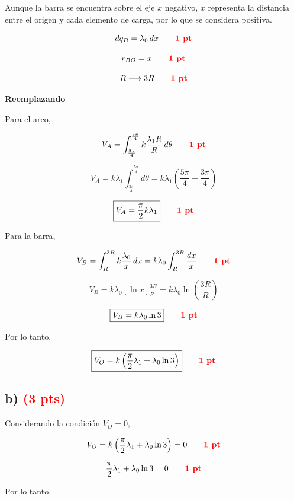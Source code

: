 \documentclass[12pt]{article}
\begin{document}
Aunque la barra se encuentra sobre el eje $x$ negativo, $x$ representa
la distancia entre el origen y cada elemento de carga, por lo que se
considera positiva.

\[
dq_B=\lambda_0\,dx
\qquad
\textcolor{red}{\textbf{1 pt}}
\]

\[
r_{BO}=x
\qquad
\textcolor{red}{\textbf{1 pt}}
\]

\[
R\longrightarrow3R
\qquad
\textcolor{red}{\textbf{1 pt}}
\]

\vspace{0.4cm}

\textbf{Reemplazando}

Para el arco,

\[
V_A
=
\int_{\frac{3\pi}{4}}^{\frac{5\pi}{4}}
k\frac{\lambda_1R}{R}\,d\theta
\qquad
\textcolor{red}{\textbf{1 pt}}
\]

\[
V_A
=
k\lambda_1
\int_{\frac{3\pi}{4}}^{\frac{5\pi}{4}}d\theta
=
k\lambda_1
\left(
\frac{5\pi}{4}-\frac{3\pi}{4}
\right)
\]

\[
\boxed{
V_A=\frac{\pi}{2}k\lambda_1
}
\qquad
\textcolor{red}{\textbf{1 pt}}
\]

Para la barra,

\[
V_B
=
\int_R^{3R}
k\frac{\lambda_0}{x}\,dx
=
k\lambda_0
\int_R^{3R}\frac{dx}{x}
\qquad
\textcolor{red}{\textbf{1 pt}}
\]

\[
V_B
=
k\lambda_0
\left[
\ln x
\right]_R^{3R}
=
k\lambda_0
\ln\left(\frac{3R}{R}\right)
\]

\[
\boxed{
V_B=k\lambda_0\ln3
}
\qquad
\textcolor{red}{\textbf{1 pt}}
\]

Por lo tanto,

\[
\boxed{
V_O
=
k\left(
\frac{\pi}{2}\lambda_1+\lambda_0\ln3
\right)
}
\qquad
\textcolor{red}{\textbf{1 pt}}
\]


\subsection*{b) \hfill \textcolor{red}{\textbf{(3 pts)}}}

Considerando la condición $V_O=0$,

\[
V_O
=
k\left(
\frac{\pi}{2}\lambda_1+\lambda_0\ln3
\right)
=
0
\qquad
\textcolor{red}{\textbf{1 pt}}
\]

\[
\frac{\pi}{2}\lambda_1+\lambda_0\ln3=0
\qquad
\textcolor{red}{\textbf{1 pt}}
\]

Por lo tanto,
\end{document}
